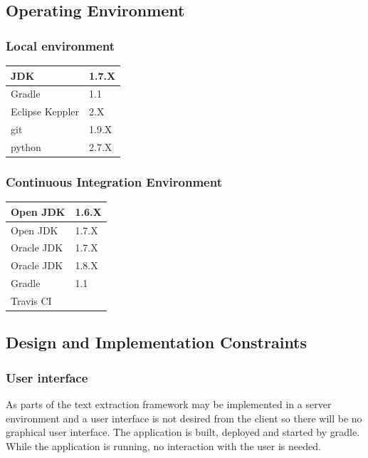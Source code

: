 \subsection{Operating Environment}

\subsubsection{Local environment}

\begin{tabular}{| p{3cm} | p{3cm} |}
	\hline
	JDK & 1.7.X  \\ \hline
	Gradle & 1.1 \\ \hline
	Eclipse Keppler & 2.X \\ \hline
	git & 1.9.X \\ \hline
	python & 2.7.X \\ \hline
\end{tabular}


\subsubsection{Continuous Integration Environment}

\begin{tabular}{| p{3cm} | p{3cm} |}
	\hline
	Open JDK & 1.6.X  \\ \hline
	Open JDK & 1.7.X  \\ \hline
	Oracle JDK & 1.7.X \\ \hline
	Oracle JDK & 1.8.X  \\ \hline
	Gradle & 1.1 \\ \hline
	Travis CI &  \\ \hline
\end{tabular}



\subsection{Design and Implementation Constraints}

\subsubsection{User interface}
As parts of the text extraction framework may be implemented in a server environment and a user interface is not desired from the client so there will be no graphical user interface. The application is built, deployed and started by gradle. While the application is running, no interaction with the user is needed.


